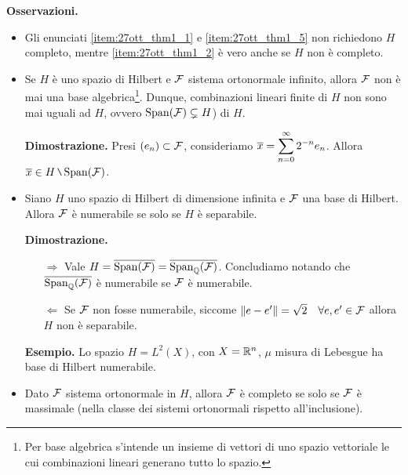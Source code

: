 \textbf{Osservazioni.}
\begin{itemize}
\item Gli enunciati \ref{item:27ott_thm1_1} e \ref{item:27ott_thm1_5} non richiedono $H$ completo, mentre \ref{item:27ott_thm1_2} è vero anche se $H$ non è completo.

\item Se $H$ è uno spazio di Hilbert e $\mathcal{F}$ sistema ortonormale infinito, allora $\mathcal{F}$ non è mai una base algebrica\footnote{Per base algebrica s'intende un insieme di vettori di uno spazio vettoriale le cui combinazioni lineari generano tutto lo spazio.}. Dunque, combinazioni lineari finite di $H$ non sono mai uguali ad $H$, ovvero $\operatorname{Span}(\mathcal{F}) \subsetneq H $) di $H$.

\textbf{Dimostrazione.} Presi $(e_n) \subset \mathcal{F}$, consideriamo $\displaystyle \overline{x} = \sum_{n=0}^{\infty} 2^{-n}e_n $. Allora  $\ds \ol{x} \in H \setminus \spn(\mc{F})$.
%

\item Siano $H$ uno spazio di Hilbert di dimensione infinita e $\mathcal{F}$ una base di Hilbert. Allora $\mathcal{F}$ è numerabile se solo se $H$ è separabile.

\textbf{Dimostrazione.}

\begin{itemize}

\item[$\boxed{\Rightarrow}$] Vale $ H = \overline{\operatorname{Span}(\mathcal{F})} = \overline{\operatorname{Span}_\mathbb Q (\mathcal{F})} $. Concludiamo notando che $\overline{\operatorname{Span}_\mathbb Q (\mathcal{F})}$ è numerabile se  $\mathcal{F}$ è numerabile.

\item[$\boxed{\Leftarrow}$] Se $\mathcal{F}$ non fosse numerabile, siccome $\left\lVert e - e' \right\rVert = \sqrt{2}  \quad \forall e,e' \in \mathcal{F}$ allora $H$ non è separabile.

\end{itemize}

\textbf{Esempio.} Lo spazio $H = L^2(X)$, con $X = \mathbb R^n$, $\mu $ misura di Lebesgue ha base di Hilbert numerabile.

\item Dato $\mathcal{F}$ sistema ortonormale in $H$, allora $\mathcal{F}$ è completo se solo se $\mathcal{F}$ è massimale (nella classe dei sistemi ortonormali rispetto all'inclusione).


\end{itemize}
